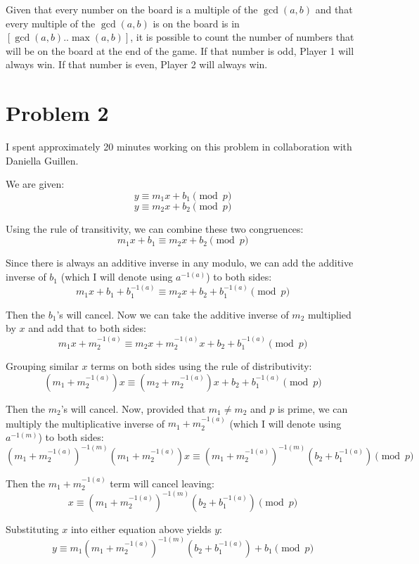 \documentclass{article}
\begin{document}
Given that every number on the board is a multiple of the $\gcd(a, b)$ and that
every multiple of the $\gcd(a,b)$ is on the board is in $[\gcd(a,b) ..
\max(a,b)]$, it is possible to count the number of numbers that will be on the
board at the end of the game. If that number is odd, Player 1 will always win.
If that number is even, Player 2 will always win.

\break

\section*{Problem 2}

I spent approximately 20 minutes working on this problem in collaboration with
Daniella Guillen.

\bigbreak

We are given: 
$$ y \equiv m_1 x + b_1 \pmod{p} $$ $$ y \equiv m_2 x + b_2 \pmod{p} $$

Using the rule of transitivity, we can combine these two congruences: 
$$ m_1 x + b_1 \equiv m_2 x + b_2 \pmod{p} $$

Since there is always an additive inverse in any modulo, we can add the additive
inverse of $b_1$ (which I will denote using $a^{-1(a)}$) to both
sides: 
$$ m_1 x + b_1 + b_1^{-1(a)} \equiv m_2 x + b_2 + b_1^{-1(a)} \pmod{p} $$

Then the $b_1$'s will cancel. Now we can take the additive inverse of $m_2$
multiplied by $x$ and add that to both sides: 
$$ m_1 x + m_2^{-1(a)} \equiv m_2 x + m_2^{-1(a)} x + b_2 + b_1^{-1(a)} \pmod{p}
$$

Grouping similar $x$ terms on both sides using the rule of distributivity: 
$$ \left(m_1 + m_2^{-1(a)}\right) x \equiv \left(m_2 + m_2^{-1(a)}\right) x +
b_2 + b_1^{-1(a)} \pmod{p} $$

Then the $m_2$'s will cancel. Now, provided that $m_1 \neq m_2$ and $p$ is
prime, we can multiply the multiplicative inverse of $m_1 + m_2^{-1(a)}$ (which
I will denote using $a^{-1(m)}$) to both sides: 
$$ \left(m_1 + m_2^{-1(a)}\right)^{-1(m)} \left(m_1 + m_2^{-1(a)}\right) x
\equiv \left(m_1 + m_2^{-1(a)}\right)^{-1(m)} \left(b_2 + b_1^{-1(a)}\right)
\pmod{p} $$

Then the $m_1 + m_2^{-1(a)}$ term will cancel leaving: 
$$ x \equiv \left(m_1 + m_2^{-1(a)}\right)^{-1(m)} \left(b_2 +
b_1^{-1(a)}\right) \pmod{p} $$

Substituting $x$ into either equation above yields $y$: 
$$ y \equiv m_1 \left(m_1 + m_2^{-1(a)}\right)^{-1(m)} \left(b_2 +
b_1^{-1(a)}\right) + b_1 \pmod{p} $$
\end{document}
